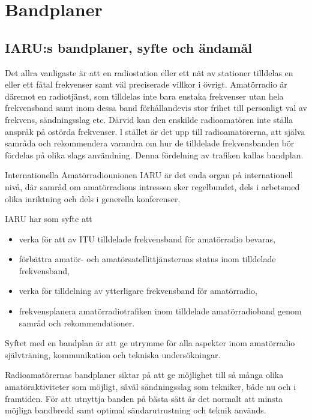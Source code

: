 \section{Bandplaner}

\subsection{IARU:s bandplaner, syfte och ändamål}

Det allra vanligaste är att en radiostation eller ett nät av stationer tilldelas
en eller ett fåtal frekvenser samt väl preciserade villkor i övrigt. Amatörradio
är däremot en radiotjänst, som tilldelas inte bara enstaka frekvenser utan hela
frekvensband samt inom dessa band förhållandevis stor frihet till personligt val
av frekvens, sändningsslag etc.  Därvid kan den enskilde radioamatören inte
ställa anspråk på ostörda frekvenser. l stället är det upp till radioamatörerna,
att själva samråda och rekommendera varandra om hur de tilldelade frekvensbanden
bör fördelas på olika slags användning. Denna fördelning av trafiken kallas
bandplan.

Internationella Amatörradiounionen IARU är det enda organ på internationell
nivå, där samråd om amatörradions intressen sker regelbundet, dels i arbetsmed
olika inriktning och dels i generella konferenser.

IARU har som syfte att

\begin{itemize}
\item verka för att av ITU tilldelade frekvensband för amatörradio bevaras,
\item förbättra amatör- och amatörsatellittjänsternas status inom tilldelade
  frekvensband,
\item verka för tilldelning av ytterligare frekvensband för amatörradio,
\item frekvensplanera amatörradiotrafiken inom tilldelade amatörradioband genom
  samråd och rekommendationer.
\end{itemize}

Syftet med en bandplan är att ge utrymme för alla aspekter inom amatörradio
självträning, kommunikation och tekniska undersökningar.

Radioamatörernas bandplaner siktar på att ge möjlighet till så många olika
amatöraktiviteter som möjligt, såväl sändningsslag som tekniker, både nu och i
framtiden. För att utnyttja banden på bästa sätt är det normalt att minsta
möjliga bandbredd samt optimal sändarutrustning och teknik används.


